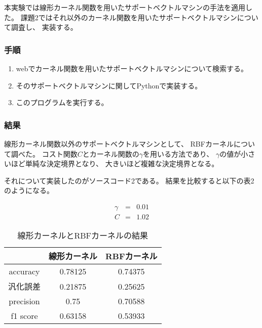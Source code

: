 \documentclass[12pt]{jarticle}
\begin{document}
本実験では線形カーネル関数を用いたサポートベクトルマシンの手法を適用した。
課題2ではそれ以外のカーネル関数を用いたサポートベクトルマシンについて調査し、
実装する。

\subsubsection*{手順}
\begin{enumerate}
    \item webでカーネル関数を用いたサポートベクトルマシンについて検索する。
    \item そのサポートベクトルマシンに関してPythonで実装する。
    \item このプログラムを実行する。
\end{enumerate}

\subsubsection*{結果}
線形カーネル関数以外のサポートベクトルマシンとして、
RBFカーネルについて調べた。
コスト関数$C$とカーネル関数の$\gamma$を用いる方法であり、
$\gamma$の値が小さいほど単純な決定境界となり、
大きいほど複雑な決定境界となる。

それについて実装したのがソースコード2である。
結果を比較すると以下の表2のようになる。

\begin{eqnarray}
    \gamma &=& 0.01 \nonumber\\
    C &=& 1.02 \nonumber
\end{eqnarray}

\begin{table}[htb]
    \caption{線形カーネルとRBFカーネルの結果}
    \begin{center}
        \begin{tabular}{|c||c|c|}
            \hline
                      & 線形カーネル & RBFカーネル \\ \hline \hline
            accuracy  & 0.78125      & 0.74375     \\ \hline
            汎化誤差  & 0.21875      & 0.25625     \\ \hline
            precision & 0.75         & 0.70588     \\ \hline
            f1 score  & 0.63158      & 0.53933     \\ \hline
        \end{tabular}
    \end{center}
\end{table}
\end{document}
